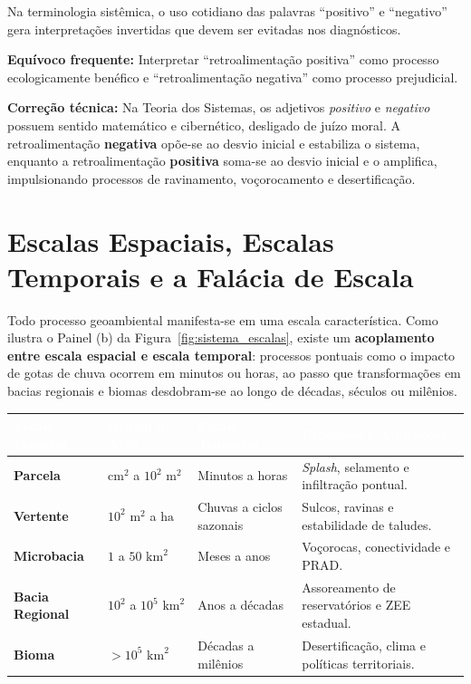 Na terminologia sistêmica, o uso cotidiano das palavras ``positivo'' e ``negativo'' gera interpretações invertidas que devem ser evitadas nos diagnósticos.

\begin{boxErro}
  \textbf{Equívoco frequente:} Interpretar ``retroalimentação positiva'' como processo ecologicamente benéfico e ``retroalimentação negativa'' como processo prejudicial.\par
  \textbf{Correção técnica:} Na Teoria dos Sistemas, os adjetivos \emph{positivo} e \emph{negativo} possuem sentido matemático e cibernético, desligado de juízo moral. A retroalimentação \textbf{negativa} opõe-se ao desvio inicial e estabiliza o sistema, enquanto a retroalimentação \textbf{positiva} soma-se ao desvio inicial e o amplifica, impulsionando processos de ravinamento, voçorocamento e desertificação.
\end{boxErro}

\section{Escalas Espaciais, Escalas Temporais e a Falácia de Escala}

Todo processo geoambiental manifesta-se em uma escala característica. Como ilustra o Painel (b) da Figura~\ref{fig:sistema_escalas}, existe um \textbf{acoplamento entre escala espacial e escala temporal}: processos pontuais como o impacto de gotas de chuva ocorrem em minutos ou horas, ao passo que transformações em bacias regionais e biomas desdobram-se ao longo de décadas, séculos ou milênios.

\begin{center}
\renewcommand{\arraystretch}{1.18}
\small
\begin{tabularx}{\textwidth}{@{}p{2.7cm} p{2.4cm} p{2.8cm} >{\raggedright\arraybackslash}X@{}}
  \toprule
  \rowcolor{uefsNavy}
  \textcolor{white}{\bfseries Escala Espacial} & \textcolor{white}{\bfseries Ordem de Área} & \textcolor{white}{\bfseries Escala Temporal} & \textcolor{white}{\bfseries Processos e Aplicações} \\
  \midrule
  \textbf{Parcela} & $\text{cm}^2$ a $10^2\text{ m}^2$ & Minutos a horas & \textit{Splash}, selamento e infiltração pontual. \\
  \rowcolor{bgGray}
  \textbf{Vertente} & $10^2\text{ m}^2$ a $\text{ha}$ & Chuvas a ciclos sazonais & Sulcos, ravinas e estabilidade de taludes. \\
  \textbf{Microbacia} & $1$ a $50\text{ km}^2$ & Meses a anos & Voçorocas, conectividade e PRAD. \\
  \rowcolor{bgGray}
  \textbf{Bacia Regional} & $10^2$ a $10^5\text{ km}^2$ & Anos a décadas & Assoreamento de reservatórios e ZEE estadual. \\
  \textbf{Bioma} & $> 10^5\text{ km}^2$ & Décadas a milênios & Desertificação, clima e políticas territoriais. \\
  \bottomrule
\end{tabularx}
\end{center}

